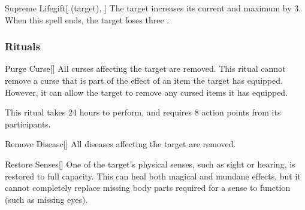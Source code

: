 \lowercase{\hypertarget{spell:Supreme Lifegift}{}}\label{spell:Supreme Lifegift}
\begin{attuneability}[Rank 8]{\hypertarget{spell:Supreme Lifegift}{Supreme Lifegift}}[ (target), ]
The target increases its current and maximum  by 3.
When this spell ends, the target loses three .
\end{attuneability}
\vspace{0.25em}



\subsubsection{Rituals}


\lowercase{\hypertarget{spell:Purge Curse}{}}\label{spell:Purge Curse}
\begin{apability}[Rank 3]{\hypertarget{spell:Purge Curse}{Purge Curse}}[]
All curses affecting the target are removed.
This ritual cannot remove a curse that is part of the effect of an item the target has equipped.
However, it can allow the target to remove any cursed items it has equipped.

This ritual takes 24 hours to perform, and requires 8 action points from its participants.
\end{apability}
\vspace{0.25em}



\lowercase{\hypertarget{spell:Remove Disease}{}}\label{spell:Remove Disease}
\begin{apability}[Rank 3]{\hypertarget{spell:Remove Disease}{Remove Disease}}[]
All diseases affecting the target are removed.
\end{apability}
\vspace{0.25em}



\lowercase{\hypertarget{spell:Restore Senses}{}}\label{spell:Restore Senses}
\begin{apability}[Rank 3]{\hypertarget{spell:Restore Senses}{Restore Senses}}[]
One of the target's physical senses, such as sight or hearing, is restored to full capacity.
This can heal both magical and mundane effects, but it cannot completely replace missing body parts required for a sense to function (such as missing eyes).
\end{apability}
\vspace{0.25em}



